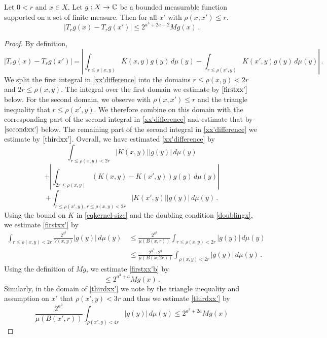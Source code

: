 \begin{lemma}
\label{estimate-x-shift}
\leanok
{}
Let $0<r$ and  $x\in X$. Let $g:X\to\mathbb{C}$ be a bounded measurable function supported on a set of finite measure.
Then for all $x'$ with $\rho(x,x')\le r$.
\begin{equation*}
\left| T_r g(x) - T_r g(x') \right|
\le 2^{a^3 + 2a + 2} Mg(x)\, .
\end{equation*}
\end{lemma}
\begin{proof}
\leanok
By definition,
\begin{equation}
\label{xx'difference}
\left| T_r g(x) - T_r g(x') \right|
=\left|\int_{r\le\rho(x,y)} K(x,y) g(y) \,d\mu(y)
-\int_{r\le\rho(x',y)}
K(x',y) g(y)\, d\mu(y)
\right| \, .
\end{equation}
We split the first integral in \eqref{xx'difference}
into the domains $r\le\rho(x,y)<2r$
and $2r\le\rho(x,y)$. The integral over the first domain we estimate
by $\eqref{firstxx'}$ below.
For the second domain, we
observe with $\rho(x,x')\le r$ and the triangle inequality that $r\le\rho(x',y)$. We therefore combine on this domain with the
corresponding part of the second integral in \eqref{xx'difference} and estimate that by $\eqref{secondxx'}$
below. The remaining part of the second integral in
\eqref{xx'difference} we estimate by $\eqref{thirdxx'}$.
Overall, we have estimated \eqref{xx'difference} by
\begin{equation}
\label{firstxx'}
\int_{r\le\rho(x,y)< 2r} |K(x,y)| |g(y)| \,d\mu(y)
\end{equation}
\begin{equation}
\label{secondxx'}
  +  \left|\int_{2r\le\rho(x,y)} (K(x,y)-K(x',y)) g(y) \,d\mu(y)
\right|
\end{equation}
\begin{equation}
\label{thirdxx'}
  +\int_{r\le\rho(x',y), r\le\rho(x,y)<2r}
|K(x',y)| |g(y)|\, d\mu(y)\,.
\end{equation}
Using the bound on $K$ in \eqref{eqkernel-size} and the doubling condition \eqref{doublingx}, we estimate \eqref{firstxx'} by
\begin{align}
 \int_{r\le\rho(x,y)<2r} \frac{2^{a^3}}{V(x,y)} |g(y)| \,d\mu(y)\,
&\le
\frac{2^{a^3}}{\mu(B(x,r))} \int_{r\le\rho(x,y)<2r}
|g(y)| \, d\mu(y)\, \\
\label{firstxx'b}
&\le
\frac{2^{a^3} \cdot 2^a}{\mu(B(x,2r))} \int_{\rho(x,y)<2r}
|g(y)| \, d\mu(y)\,
.
\end{align}
Using the definition of $Mg$, we estimate
\eqref{firstxx'b} by
\begin{equation}
\label{firstxx'c}
 \le 2^{a^3 + a} {Mg(x)}\, .
\end{equation}
Similarly, in the domain of \eqref{thirdxx'}
we note by the triangle inequality
and assumption on $x'$ that $\rho(x',y)<3r$ and thus we estimate
\eqref{thirdxx'}
by
\begin{equation}
\label{thirdxx'b}
\frac{2^{a^3}}{\mu(B(x',r))} \int_{\rho(x',y)<4r}
|g(y)| \, d\mu(y)\le 2^{a^3 + 2a} Mg(x)
\end{equation}


\end{proof}
